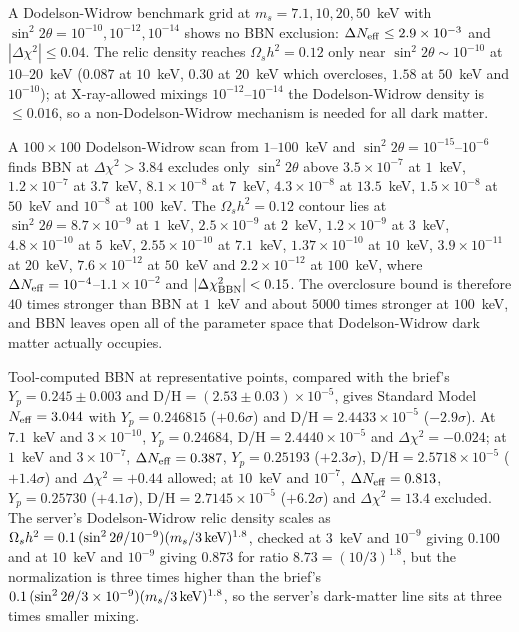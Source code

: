 \documentclass[11pt,a4paper]{article}
\begin{document}
A Dodelson-Widrow benchmark grid at $m_{s}=7.1,10,20,50$~keV with $\sin^{2}2\theta=10^{-10},10^{-12},10^{-14}$ shows no BBN exclusion: $\Delta N_{\rm eff}\le2.9\times10^{-3}$ and $|\Delta\chi^{2}|\le0.04$. The relic density reaches $\Omega_{s}h^{2}=0.12$ only near $\sin^{2}2\theta\sim10^{-10}$ at $10$--$20$~keV ($0.087$ at $10$~keV, $0.30$ at $20$~keV which overcloses, $1.58$ at $50$~keV and $10^{-10}$); at X-ray-allowed mixings $10^{-12}$--$10^{-14}$ the Dodelson-Widrow density is $\le0.016$, so a non-Dodelson-Widrow mechanism is needed for all dark matter.

A $100\times100$ Dodelson-Widrow scan from $1$--$100$~keV and $\sin^{2}2\theta=10^{-15}$--$10^{-6}$ finds BBN at $\Delta\chi^{2}>3.84$ excludes only $\sin^{2}2\theta$ above $3.5\times10^{-7}$ at $1$~keV, $1.2\times10^{-7}$ at $3.7$~keV, $8.1\times10^{-8}$ at $7$~keV, $4.3\times10^{-8}$ at $13.5$~keV, $1.5\times10^{-8}$ at $50$~keV and $10^{-8}$ at $100$~keV. The $\Omega_{s}h^{2}=0.12$ contour lies at $\sin^{2}2\theta=8.7\times10^{-9}$ at $1$~keV, $2.5\times10^{-9}$ at $2$~keV, $1.2\times10^{-9}$ at $3$~keV, $4.8\times10^{-10}$ at $5$~keV, $2.55\times10^{-10}$ at $7.1$~keV, $1.37\times10^{-10}$ at $10$~keV, $3.9\times10^{-11}$ at $20$~keV, $7.6\times10^{-12}$ at $50$~keV and $2.2\times10^{-12}$ at $100$~keV, where $\Delta N_{\rm eff}=10^{-4}$--$1.1\times10^{-2}$ and $|\Delta\chi^{2}_{\rm BBN}|<0.15$. The overclosure bound is therefore $40$ times stronger than BBN at $1$~keV and about $5000$ times stronger at $100$~keV, and BBN leaves open all of the parameter space that Dodelson-Widrow dark matter actually occupies.

Tool-computed BBN at representative points, compared with the brief's $Y_{p}=0.245\pm0.003$ and D/H$=(2.53\pm0.03)\times10^{-5}$, gives Standard Model $N_{\rm eff}=3.044$ with $Y_{p}=0.246815$ ($+0.6\sigma$) and D/H$=2.4433\times10^{-5}$ ($-2.9\sigma$). At $7.1$~keV and $3\times10^{-10}$, $Y_{p}=0.24684$, D/H$=2.4440\times10^{-5}$ and $\Delta\chi^{2}=-0.024$; at $1$~keV and $3\times10^{-7}$, $\Delta N_{\rm eff}=0.387$, $Y_{p}=0.25193$ ($+2.3\sigma$), D/H$=2.5718\times10^{-5}$ ($+1.4\sigma$) and $\Delta\chi^{2}=+0.44$ allowed; at $10$~keV and $10^{-7}$, $\Delta N_{\rm eff}=0.813$, $Y_{p}=0.25730$ ($+4.1\sigma$), D/H$=2.7145\times10^{-5}$ ($+6.2\sigma$) and $\Delta\chi^{2}=13.4$ excluded. The server's Dodelson-Widrow relic density scales as $\Omega_{s}h^{2}=0.1\,(\sin^{2}2\theta/10^{-9})(m_{s}/3\,{\rm keV})^{1.8}$, checked at $3$~keV and $10^{-9}$ giving $0.100$ and at $10$~keV and $10^{-9}$ giving $0.873$ for ratio $8.73=(10/3)^{1.8}$, but the normalization is three times higher than the brief's $0.1\,(\sin^{2}2\theta/3\times10^{-9})(m_{s}/3\,{\rm keV})^{1.8}$, so the server's dark-matter line sits at three times smaller mixing.
\end{document}
